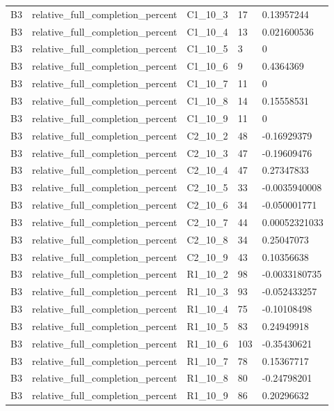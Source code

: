 \begin{longtable}{lllll}
B3 & relative\_full\_completion\_percent & C1\_10\_3 & 17 & 0.13957244 \\
B3 & relative\_full\_completion\_percent & C1\_10\_4 & 13 & 0.021600536 \\
B3 & relative\_full\_completion\_percent & C1\_10\_5 & 3 & 0 \\
B3 & relative\_full\_completion\_percent & C1\_10\_6 & 9 & 0.4364369 \\
B3 & relative\_full\_completion\_percent & C1\_10\_7 & 11 & 0 \\
B3 & relative\_full\_completion\_percent & C1\_10\_8 & 14 & 0.15558531 \\
B3 & relative\_full\_completion\_percent & C1\_10\_9 & 11 & 0 \\
B3 & relative\_full\_completion\_percent & C2\_10\_2 & 48 & -0.16929379 \\
B3 & relative\_full\_completion\_percent & C2\_10\_3 & 47 & -0.19609476 \\
B3 & relative\_full\_completion\_percent & C2\_10\_4 & 47 & 0.27347833 \\
B3 & relative\_full\_completion\_percent & C2\_10\_5 & 33 & -0.0035940008 \\
B3 & relative\_full\_completion\_percent & C2\_10\_6 & 34 & -0.050001771 \\
B3 & relative\_full\_completion\_percent & C2\_10\_7 & 44 & 0.00052321033 \\
B3 & relative\_full\_completion\_percent & C2\_10\_8 & 34 & 0.25047073 \\
B3 & relative\_full\_completion\_percent & C2\_10\_9 & 43 & 0.10356638 \\
B3 & relative\_full\_completion\_percent & R1\_10\_2 & 98 & -0.0033180735 \\
B3 & relative\_full\_completion\_percent & R1\_10\_3 & 93 & -0.052433257 \\
B3 & relative\_full\_completion\_percent & R1\_10\_4 & 75 & -0.10108498 \\
B3 & relative\_full\_completion\_percent & R1\_10\_5 & 83 & 0.24949918 \\
B3 & relative\_full\_completion\_percent & R1\_10\_6 & 103 & -0.35430621 \\
B3 & relative\_full\_completion\_percent & R1\_10\_7 & 78 & 0.15367717 \\
B3 & relative\_full\_completion\_percent & R1\_10\_8 & 80 & -0.24798201 \\
B3 & relative\_full\_completion\_percent & R1\_10\_9 & 86 & 0.20296632 \\

\end{longtable}
